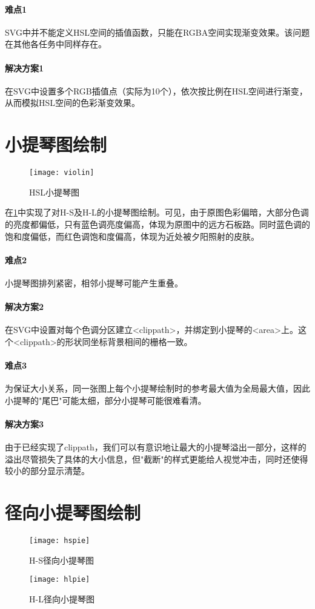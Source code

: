 \documentclass[a4paper,12pt]{article}
\begin{document}
    \paragraph{难点1} SVG中并不能定义HSL空间的插值函数，只能在RGBA空间实现渐变效果。该问题在其他各任务中同样存在。
    \paragraph{解决方案1} 在SVG中设置多个RGB插值点（实际为10个），依次按比例在HSL空间进行渐变，从而模拟HSL空间的色彩渐变效果。
    \section{小提琴图绘制}
    \begin{figure}[htbp]
      \centering
      \texttt{[image: violin]}
      \caption{HSL小提琴图}
      \label{fig:violin}
    \end{figure}

    在\cref{fig:violin}中实现了对H-S及H-L的小提琴图绘制。可见，由于原图色彩偏暗，大部分色调的亮度都偏低，只有蓝色调亮度偏高，体现为原图中的远方石板路。同时蓝色调的饱和度偏低，而红色调饱和度偏高，体现为近处被夕阳照射的皮肤。

    \paragraph{难点2} 小提琴图排列紧密，相邻小提琴可能产生重叠。
    \paragraph{解决方案2} 在SVG中设置对每个色调分区建立<clippath>，并绑定到小提琴的<area>上。这个<clippath>的形状同坐标背景相间的栅格一致。

    \paragraph{难点3} 为保证大小关系，同一张图上每个小提琴绘制时的参考最大值为全局最大值，因此小提琴的"尾巴"可能太细，部分小提琴可能很难看清。
    \paragraph{解决方案3} 由于已经实现了clippath，我们可以有意识地让最大的小提琴溢出一部分，这样的溢出尽管损失了具体的大小信息，但"截断"的样式更能给人视觉冲击，同时还使得较小的部分显示清楚。
    \section{径向小提琴图绘制}
    \begin{figure}[htbp]
      \centering
      \texttt{[image: hspie]}
      \caption{H-S径向小提琴图}
      \label{fig:hspie}
    \end{figure}
    \begin{figure}[htbp]
      \centering
      \texttt{[image: hlpie]}
      \caption{H-L径向小提琴图}
      \label{fig:hlpie}
    \end{figure}
\end{document}
